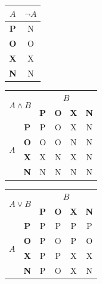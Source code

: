 \documentclass[a4paper, 11pt]{article}
\begin{document}
\begin{table}[ht]
    \begin{center}
        \begin{multicols}{4}
            \begin{tabular}{|c|c|}
                \hline
                $A$ & $\neg A$ \\ \hline
                \textbf{P} & N \\ \hline
                \textbf{O} & O \\ \hline
                \textbf{X} & X \\ \hline
                \textbf{N} & N \\
                \hline
            \end{tabular}
    
            \begin{tabular}{|c|c|c|c|c|c|}
                \hline
                \multicolumn{2}{|c|}{\multirow{2}{*}{$A \wedge B$}} & \multicolumn{4}{c|}{$B$} \\ \cline{3-6}
                \multicolumn{2}{|c|}{} & \textbf{P} & \textbf{O} & \textbf{X} & \textbf{N} \\ \hline
                \multirow{4}{*}{$A$} & \textbf{P} & P & O & X & N \\ \cline{2-6}
                & \textbf{O} & O & O & N & N \\ \cline{2-6}
                & \textbf{X} & X & N & X & N \\ \cline{2-6}
                & \textbf{N} & N & N & N & N \\  
                \hline
            \end{tabular}

            \begin{tabular}{|c|c|c|c|c|c|}
                \hline
                \multicolumn{2}{|c|}{\multirow{2}{*}{$A \vee B$}} & \multicolumn{4}{c|}{$B$} \\ \cline{3-6}
                \multicolumn{2}{|c|}{} & \textbf{P} & \textbf{O} & \textbf{X} & \textbf{N} \\ \hline
                \multirow{4}{*}{$A$} & \textbf{P} & P & P & P & P \\ \cline{2-6}
                & \textbf{O} & P & O & P & O \\ \cline{2-6}
                & \textbf{X} & P & P & X & X \\ \cline{2-6}
                & \textbf{N} & P & O & X & N \\ 
                \hline
            \end{tabular}


\end{multicols}
\end{center}
\end{table}
\end{document}
